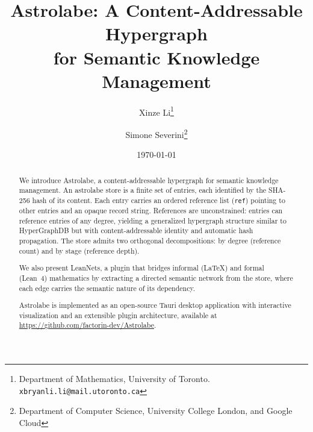 \documentclass[10pt]{article}
\title{Astrolabe: A Content-Addressable Hypergraph\\for Semantic Knowledge Management}
\author{
  Xinze Li\thanks{Department of Mathematics, University of Toronto. \texttt{xbryanli.li@mail.utoronto.ca}}
  \and
  Simone Severini\thanks{Department of Computer Science, University College London, and Google Cloud}
}
\date{\today}
\begin{document}
\maketitle

\begin{abstract}
We introduce Astrolabe, a content-addressable hypergraph for semantic knowledge management. An astrolabe store is a finite set of entries, each identified by the SHA-256 hash of its content. Each entry carries an ordered reference list (\texttt{ref}) pointing to other entries and an opaque record string. References are unconstrained: entries can reference entries of any degree, yielding a generalized hypergraph structure similar to HyperGraphDB but with content-addressable identity and automatic hash propagation. The store admits two orthogonal decompositions: by degree (reference count) and by stage (reference depth).

We also present LeanNets, a plugin that bridges informal (\LaTeX) and formal (Lean~4) mathematics by extracting a directed semantic network from the store, where each edge carries the semantic nature of its dependency.

Astrolabe is implemented as an open-source Tauri desktop application with interactive visualization and an extensible plugin architecture, available at \url{https://github.com/factorin-dev/Astrolabe}.
\end{abstract}

{\footnotesize\tableofcontents}
\newpage








\end{document}
